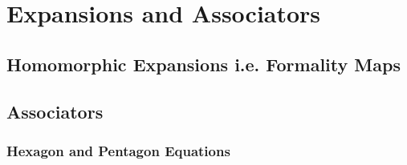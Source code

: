 \chapter{Expansions and Associators}
\label{ch:expansions-and-associators}

\section{Homomorphic Expansions i.e. Formality Maps}

\section{Associators}

\subsection{Hexagon and Pentagon Equations}
